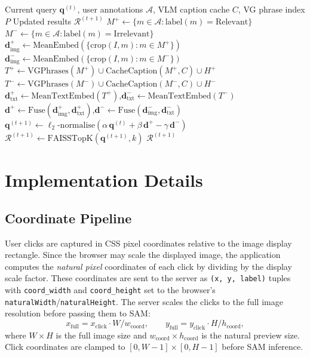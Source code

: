 \documentclass[12pt,a4paper]{article}
\newcommand{\vq}{\bm{q}}
\newcommand{\vd}{\bm{d}}
\begin{document}
\begin{algorithm}[t]
\caption{VisualReF feedback round}
\label{alg:feedback}
\begin{algorithmic}[1]
\Require Current query $\vq^{(t)}$, user annotations $\mathcal{A}$,
         VLM caption cache $C$, VG phrase index $P$
\Ensure Updated results $\mathcal{R}^{(t+1)}$
\State $M^+ \gets \{m \in \mathcal{A} : \text{label}(m) = \text{Relevant}\}$
\State $M^- \gets \{m \in \mathcal{A} : \text{label}(m) = \text{Irrelevant}\}$
\State $\vd^+_{\text{img}} \gets \text{MeanEmbed}(\{\text{crop}(I, m) : m \in M^+\})$
\State $\vd^-_{\text{img}} \gets \text{MeanEmbed}(\{\text{crop}(I, m) : m \in M^-\})$
\State $T^+ \gets \text{VGPhrases}(M^+) \cup \text{CacheCaption}(M^+, C) \cup H^+$
\State $T^- \gets \text{VGPhrases}(M^-) \cup \text{CacheCaption}(M^-, C) \cup H^-$
\State $\vd^+_{\text{txt}} \gets \text{MeanTextEmbed}(T^+)$,\quad $\vd^-_{\text{txt}} \gets \text{MeanTextEmbed}(T^-)$
\State $\vd^+ \gets \text{Fuse}(\vd^+_{\text{img}}, \vd^+_{\text{txt}})$,\quad $\vd^- \gets \text{Fuse}(\vd^-_{\text{img}}, \vd^-_{\text{txt}})$
\State $\vq^{(t+1)} \gets \ell_2\text{-normalise}(\alpha\,\vq^{(t)} + \beta\,\vd^+ - \gamma\,\vd^-)$
\State $\mathcal{R}^{(t+1)} \gets \text{FAISSTopK}(\vq^{(t+1)}, k)$
\State \Return $\mathcal{R}^{(t+1)}$
\end{algorithmic}
\end{algorithm}

\section{Implementation Details}
\label{sec:impl}

\subsection{Coordinate Pipeline}

User clicks are captured in CSS pixel coordinates relative to the image
display rectangle. Since the browser may scale the displayed image, the
application computes the \emph{natural pixel} coordinates of each click
by dividing by the display scale factor. These coordinates are sent to the
server as \texttt{(x, y, label)} tuples with \texttt{coord\_width} and
\texttt{coord\_height} set to the browser's \texttt{naturalWidth}/\texttt{naturalHeight}.
The server scales the clicks to the full image resolution before passing
them to SAM:
\[
  x_{\text{full}} = x_{\text{click}} \cdot W/w_{\text{coord}},
  \qquad
  y_{\text{full}} = y_{\text{click}} \cdot H/h_{\text{coord}},
\]
where $W \times H$ is the full image size and $w_{\text{coord}} \times h_{\text{coord}}$
is the natural preview size. Click coordinates are clamped to $[0, W-1] \times
[0, H-1]$ before SAM inference.
\end{document}
